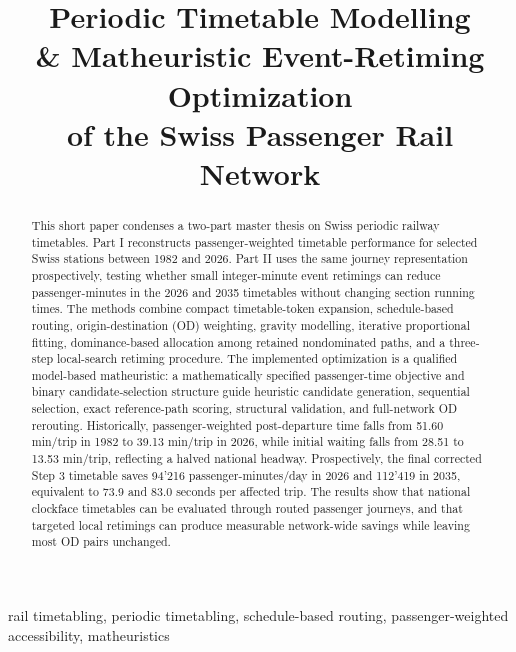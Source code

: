 \documentclass[conference]{IEEEtran}
\begin{document}
\title{Periodic Timetable Modelling\\ \& 
Matheuristic Event-Retiming Optimization\\
of the Swiss Passenger Rail Network}

\author{
}

\maketitle

\begin{abstract}
This short paper condenses a two-part master thesis on Swiss periodic railway timetables. Part I reconstructs passenger-weighted timetable performance for selected Swiss stations between 1982 and 2026. Part II uses the same journey representation prospectively, testing whether small integer-minute event retimings can reduce passenger-minutes in the 2026 and 2035 timetables without changing section running times. The methods combine compact timetable-token expansion, schedule-based routing, origin-destination (OD) weighting, gravity modelling, iterative proportional fitting, dominance-based allocation among retained nondominated paths, and a three-step local-search retiming procedure. The implemented optimization is a qualified model-based matheuristic: a mathematically specified passenger-time objective and binary candidate-selection structure guide heuristic candidate generation, sequential selection, exact reference-path scoring, structural validation, and full-network OD rerouting. Historically, passenger-weighted post-departure time falls from 51.60 min/trip in 1982 to 39.13 min/trip in 2026, while initial waiting falls from 28.51 to 13.53 min/trip, reflecting a halved national headway. Prospectively, the final corrected Step 3 timetable saves 94'216 passenger-minutes/day in 2026 and 112'419 in 2035, equivalent to 73.9 and 83.0 seconds per affected trip. The results show that national clockface timetables can be evaluated through routed passenger journeys, and that targeted local retimings can produce measurable network-wide savings while leaving most OD pairs unchanged.
\end{abstract}

\begin{IEEEkeywords}
rail timetabling, periodic timetabling, schedule-based routing, passenger-weighted accessibility, matheuristics
\end{IEEEkeywords}
\end{document}
